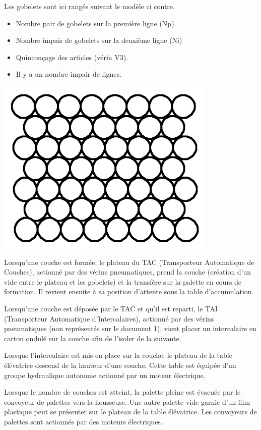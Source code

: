 \begin{minipage}{0.48\linewidth}
Les gobelets sont ici rangés suivant le modèle ci contre.
\begin{itemize}
 \item Nombre pair de gobelets sur la première ligne (Np).
 \item Nombre impair de gobelets sur la deuxième ligne (Ni)
 \item \og Quinconçage \fg des articles (vérin V3).
 \item Il y a un nombre impair de lignes.
\end{itemize}
\end{minipage}
 \hfill
\begin{minipage}{0.38\linewidth}
 \includegraphics[width=0.5\linewidth]{img/Rangement.png}
\end{minipage}

Lorsqu'une couche est formée, le plateau du TAC (Transporteur Automatique de Couches), actionné par des vérins pneumatiques, prend la couche (création d'un vide entre le plateau et les gobelets) et la transfère sur la palette en cours de formation. Il revient ensuite à sa position d'attente sous la table d'accumulation.

Lorsqu'une couche est déposée par le TAC et qu'il est reparti, le TAI (Transporteur Automatique d'Intercalaires), actionné par des vérins pneumatiques (non représentés sur le document 1), vient placer un intercalaire en carton ondulé sur la couche afin de l'isoler de la suivante.

Lorsque l'intercalaire est mis en place sur la couche, le plateau de la table élévatrice descend de la hauteur d'une couche. Cette table est équipée d'un groupe hydraulique autonome actionné par un moteur électrique.

Lorsque le nombre de couches est atteint, la palette pleine est évacuée par le convoyeur de palettes vers la housseuse. Une autre palette vide garnie d'un film plastique peut se présenter sur le plateau de la table élévatrice. Les convoyeurs de palettes sont actionnés par des moteurs électriques.


